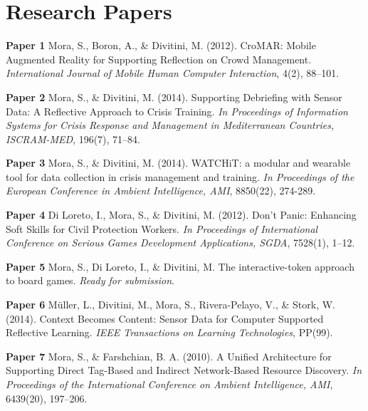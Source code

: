 \chapter{Research Papers}\label{papers}

\textbf{Paper 1} Mora, S., Boron, A., \& Divitini, M. (2012). CroMAR:
Mobile Augmented Reality for Supporting Reflection on Crowd Management.
\emph{International Journal of Mobile Human Computer Interaction}, 4(2),
88--101. 

\textbf{Paper 2} Mora, S., \& Divitini, M. (2014). Supporting Debriefing
with Sensor Data: A Reflective Approach to Crisis Training. \emph{In
Proceedings of Information Systems for Crisis Response and Management in
Mediterranean Countries, ISCRAM-MED}, 196(7), 71--84. 

\textbf{Paper 3} Mora, S., \& Divitini, M. (2014). WATCHiT: a modular
and wearable tool for data collection in crisis management and training.
\emph{In Proceedings of the European Conference in Ambient Intelligence,
AMI}, 8850(22), 274-289. 

\textbf{Paper 4} Di Loreto, I., Mora, S., \& Divitini, M. (2012). Don't
Panic: Enhancing Soft Skills for Civil Protection Workers. \emph{In
Proceedings of International Conference on Serious Games Development
Applications, SGDA}, 7528(1), 1--12. 

\textbf{Paper 5} Mora, S., Di Loreto, I., \& Divitini, M. The
interactive-token approach to board games. \emph{Ready for submission}.

\textbf{Paper 6} Müller, L., Divitini, M., Mora, S., Rivera-Pelayo, V.,
\& Stork, W. (2014). Context Becomes Content: Sensor Data for Computer
Supported Reflective Learning. \emph{IEEE Transactions on Learning
Technologies}, PP(99). 

\textbf{Paper 7} Mora, S., \& Farshchian, B. A. (2010). A Unified
Architecture for Supporting Direct Tag-Based and Indirect Network-Based
Resource Discovery. \emph{In Proceedings of the International Conference
on Ambient Intelligence, AMI}, 6439(20), 197--206. 

